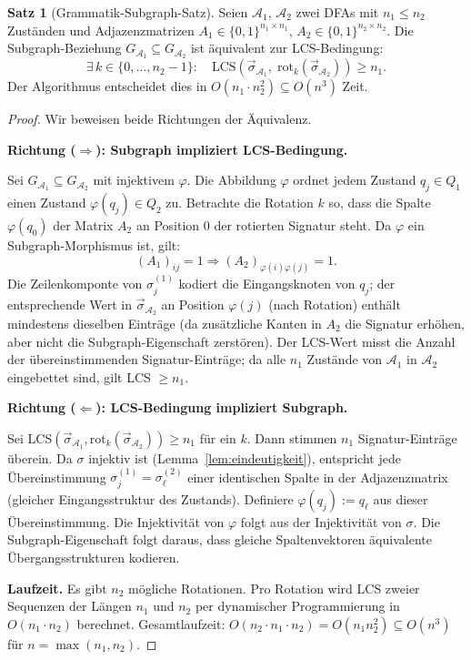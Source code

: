 ﻿\documentclass[a4paper,12pt]{article}
\theoremstyle{definition}
\newtheorem{satz}{Satz}
\begin{document}
\begin{satz}[Grammatik-Subgraph-Satz]
\label{satz:gramsubgraph}
Seien $\mathcal{A}_1$, $\mathcal{A}_2$ zwei DFAs mit $n_1 \leq n_2$ Zust\"anden
und Adjazenzmatrizen $A_1 \in \{0,1\}^{n_1 \times n_1}$,
$A_2 \in \{0,1\}^{n_2 \times n_2}$. Die Subgraph-Beziehung
$G_{\mathcal{A}_1} \subseteq G_{\mathcal{A}_2}$ ist \"aquivalent zur
LCS-Bedingung:
\[
\exists\, k \in \{0,\ldots,n_2-1\}:\quad
\mathrm{LCS}\!\left(\vec{\sigma}_{\mathcal{A}_1},\;
\mathrm{rot}_k(\vec{\sigma}_{\mathcal{A}_2})\right) \geq n_1.
\]
Der Algorithmus entscheidet dies in $O(n_1 \cdot n_2^2) \subseteq O(n^3)$ Zeit.
\end{satz}

\begin{proof}
Wir beweisen beide Richtungen der \"Aquivalenz.

\medskip
\textbf{Richtung ($\Rightarrow$): Subgraph impliziert LCS-Bedingung.}

Sei $G_{\mathcal{A}_1} \subseteq G_{\mathcal{A}_2}$ mit injektivem $\varphi$.
Die Abbildung $\varphi$ ordnet jedem Zustand $q_j \in Q_1$ einen Zustand
$\varphi(q_j) \in Q_2$ zu. Betrachte die Rotation $k$ so, dass die Spalte
$\varphi(q_0)$ der Matrix $A_2$ an Position $0$ der rotierten Signatur steht.
Da $\varphi$ ein Subgraph-Morphismus ist, gilt:
\[
(A_1)_{ij} = 1 \Rightarrow (A_2)_{\varphi(i)\varphi(j)} = 1.
\]
Die Zeilenkomponte von $\sigma_j^{(1)}$ kodiert die Eingangsknoten von $q_j$;
der entsprechende Wert in $\vec{\sigma}_{\mathcal{A}_2}$ an Position $\varphi(j)$
(nach Rotation) enth\"alt mindestens dieselben Eintr\"age (da zus\"atzliche
Kanten in $A_2$ die Signatur erh\"ohen, aber nicht die Subgraph-Eigenschaft
zerst\"oren). Der LCS-Wert misst die Anzahl der \"ubereinstimmenden
Signatur-Eintr\"age; da alle $n_1$ Zust\"ande von $\mathcal{A}_1$ in $\mathcal{A}_2$
eingebettet sind, gilt LCS $\geq n_1$.

\medskip
\textbf{Richtung ($\Leftarrow$): LCS-Bedingung impliziert Subgraph.}

Sei LCS$(\vec{\sigma}_{\mathcal{A}_1}, \mathrm{rot}_k(\vec{\sigma}_{\mathcal{A}_2})) \geq n_1$
f\"ur ein $k$. Dann stimmen $n_1$ Signatur-Eintr\"age \"uberein.
Da $\sigma$ injektiv ist (Lemma~\ref{lem:eindeutigkeit}), entspricht jede
\"Ubereinstimmung $\sigma_j^{(1)} = \sigma_{\ell}^{(2)}$ einer identischen
Spalte in der Adjazenzmatrix (gleicher Eingangsstruktur des Zustands).
Definiere $\varphi(q_j) := q_{\ell}$ aus dieser \"Ubereinstimmung.
Die Injektivit\"at von $\varphi$ folgt aus der Injektivit\"at von $\sigma$.
Die Subgraph-Eigenschaft folgt daraus, dass gleiche Spaltenvektoren
\"aquivalente \"Ubergangsstrukturen kodieren.

\medskip
\textbf{Laufzeit.}
Es gibt $n_2$ m\"ogliche Rotationen. Pro Rotation wird LCS zweier Sequenzen der
L\"angen $n_1$ und $n_2$ per dynamischer Programmierung in $O(n_1 \cdot n_2)$
berechnet. Gesamtlaufzeit: $O(n_2 \cdot n_1 \cdot n_2) = O(n_1 n_2^2)
\subseteq O(n^3)$ f\"ur $n = \max(n_1, n_2)$.
\end{proof}
\end{document}
